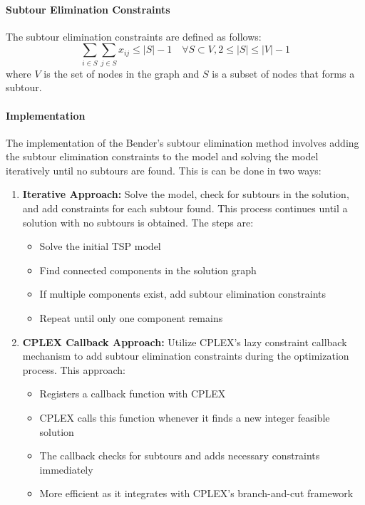\documentclass{article}
\begin{document}
\paragraph{Subtour Elimination Constraints}
The subtour elimination constraints are defined as follows: 
\begin{equation}
	\sum_{i \in S} \sum_{j \in S} x_{ij} \leq |S| - 1 \quad \forall S \subset V, 2 \leq |S| \leq |V| - 1
\end{equation}
where $V$ is the set of nodes in the graph and $S$ is a subset of nodes that forms a subtour.

\paragraph{Implementation}
The implementation of the Bender's subtour elimination method involves adding the subtour elimination constraints to the model and solving the model iteratively until no subtours are found.
This is can be done in two ways:
\begin{enumerate}
    \item \textbf{Iterative Approach:} Solve the model, check for subtours in the solution, and add constraints for each subtour found. This process continues until a solution with no subtours is obtained. The steps are:
    \begin{itemize}
        \item Solve the initial TSP model
        \item Find connected components in the solution graph
        \item If multiple components exist, add subtour elimination constraints
        \item Repeat until only one component remains
    \end{itemize}
    
    \item \textbf{CPLEX Callback Approach:} Utilize CPLEX's lazy constraint callback mechanism to add subtour elimination constraints during the optimization process. This approach:
    \begin{itemize}
        \item Registers a callback function with CPLEX
        \item CPLEX calls this function whenever it finds a new integer feasible solution
        \item The callback checks for subtours and adds necessary constraints immediately
        \item More efficient as it integrates with CPLEX's branch-and-cut framework
    \end{itemize}
\end{enumerate}
\end{document}
